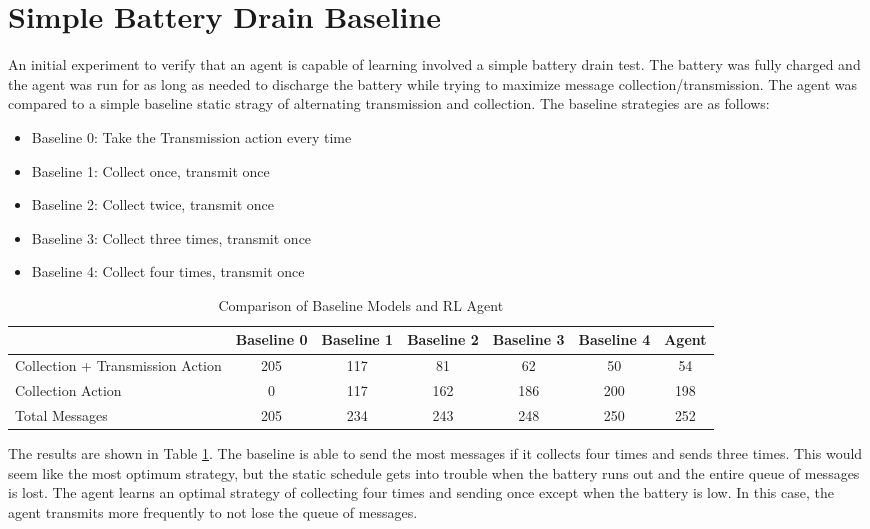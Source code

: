 \documentclass[10pt]{cai}
\begin{document}
\section{Simple Battery Drain Baseline}
An initial experiment to verify that an agent is capable of learning involved a simple battery drain test.
The battery was fully charged and the agent was run for as long as needed to discharge the battery while trying to maximize message collection/transmission.
The agent was compared to a simple baseline static stragy of alternating transmission and collection.
The baseline strategies are as follows:
\begin{itemize}
  \item Baseline 0: Take the Transmission action every time
  \item Baseline 1: Collect once, transmit once
  \item Baseline 2: Collect twice, transmit once
  \item Baseline 3: Collect three times, transmit once
  \item Baseline 4: Collect four times, transmit once
\end{itemize}

\begin{table}[h]
  \centering
  \caption{Comparison of Baseline Models and RL Agent}
  \begin{tabular}{lcccccc}
      \toprule
      & \textbf{Baseline 0} & \textbf{Baseline 1} & \textbf{Baseline 2} & \textbf{Baseline 3} & \textbf{Baseline 4} & \textbf{Agent} \\
      \midrule
      Collection + Transmission Action & 205 & 117 & 81  & 62  & 50  & 54  \\
      Collection Action                 & 0   & 117 & 162 & 186 & 200 & 198 \\
      Total Messages                     & 205 & 234 & 243 & 248 & 250 & 252 \\
      \bottomrule
  \end{tabular}
  \label{tab:batter_drain_result}
\end{table}

The results are shown in Table \ref{tab:batter_drain_result}.
The baseline is able to send the most messages if it collects four times and sends three times.
This would seem like the most optimum strategy, but the static schedule gets into trouble when the battery runs out and the entire queue of messages is lost.
The agent learns an optimal strategy of collecting four times and sending once except when the battery is low.
In this case, the agent transmits more frequently to not lose the queue of messages.
\end{document}
